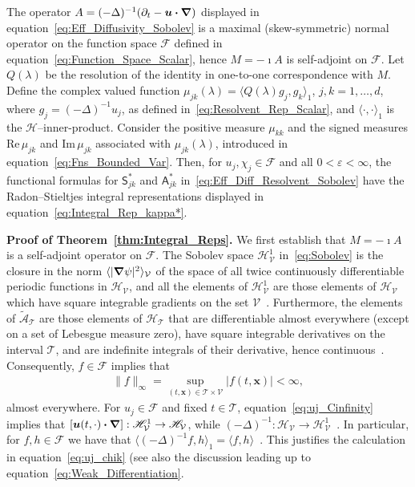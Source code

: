 \documentclass[leqno,onefignum,onetabnum]{siamltex1213}
\newcommand{\thmref}[1]{Theorem~\ref{#1}}
\newcommand\Real{\mbox{Re}\,} %
\newcommand\Imag{\mbox{Im}\,} %
\newcommand{\Tc}{\mathcal{T}}
\newcommand{\Vc}{\mathcal{V}}
\newcommand{\Sm}{\mathsf{S}}
\newcommand{\Am}{\mathsf{A}}
\newcommand{\Hs}{\mathscr{H}}
\newcommand{\As}{\mathscr{A}}
\newcommand{\Fs}{\mathscr{F}}
\newcommand\bnabla{\mbox{\boldmath${\nabla}$}}
\providecommand\bcdot{\boldsymbol{\cdot}}
\newcommand{\vecx}{\boldsymbol{x}}
\newcommand{\vecu}{\boldsymbol{u}}
\begin{document}
%
\begin{theorem}\label{thm:Integral_Reps}
  The operator $A=(-\Delta)^{-1}(\partial_t-\vecu\bcdot\bnabla)$ displayed in
  equation~\eqref{eq:Eff_Diffusivity_Sobolev} is a maximal
  (skew-symmetric) normal operator on the function space $\Fs$ defined
  in equation~\eqref{eq:Function_Space_Scalar}, hence $M=-\imath A$ is 
  self-adjoint on $\Fs$. Let $Q(\lambda)$ be the resolution of the
  identity in one-to-one correspondence with $M$. Define the complex
  valued   function $\mu_{jk}(\lambda)=\langle Q(\lambda)g_j,g_k\rangle_1$, $j,k=1,\ldots,d$, where
  $g_j=(-\Delta)^{-1}u_j$, as defined in~\eqref{eq:Resolvent_Rep_Scalar}, and 
  $\langle\cdot,\cdot\rangle_1$ is the $\Hs$--inner-product. Consider the positive measure
  $\mu_{kk}$ and the signed measures $\Real\mu_{jk}$ and $\Imag\mu_{jk}$
  associated with $\mu_{jk}(\lambda)$, introduced in
  equation~\eqref{eq:Fns_Bounded_Var}.  Then, for $u_j,\chi_j\in\Fs$
  and all $0<\varepsilon<\infty$,
  the functional formulas for $\Sm^*_{jk}$ and $\Am^*_{jk}$ 
  in~\eqref{eq:Eff_Diff_Resolvent_Sobolev} have the 
  Radon--Stieltjes integral representations displayed in
  equation~\eqref{eq:Integral_Rep_kappa*}.   
% 
\end{theorem}
%

\textbf{Proof of \thmref{thm:Integral_Reps}.}\hspace{1ex}
%
We first establish that $M=-\imath A$ is a self-adjoint operator on
$\Fs$. The Sobolev space $\Hs^1_{\Vc}$ in~\eqref{eq:Sobolev} is the
closure in the norm $\langle|\bnabla\psi|^2\rangle_{\Vc}$ of the space of all twice
continuously differentiable periodic functions in $\Hs_{\Vc}$, and all
the elements of $\Hs^1_{\Vc}$ are those elements of $\Hs_{\Vc}$ which
have square integrable gradients on the set
$\Vc$~\cite{Bhattacharya:AAP:1999:951}. Furthermore, the elements of
$\tilde{\As}_{\Tc}$ are those elements of $\Hs_{\Tc}$ that are
differentiable almost everywhere (except on a set of Lebesgue measure
zero), have square integrable derivatives on the interval
$\Tc$, and are indefinite integrals of their
derivative, hence continuous~\cite{Royden:1988:RA}. Consequently,
$f\in\Fs$ implies that~\cite{Stone:64,Royden:1988:RA}  
%
\begin{align}\label{eq:uj_Cinfinity}
  \|f\|_\infty=\sup_{(t,\vecx)\in\Tc\times\Vc}|f(t,\vecx)|<\infty,
\end{align}
%
almost everywhere. For $u_j\in\Fs$ and fixed $t\in\Tc$,
equation~\eqref{eq:uj_Cinfinity} implies that 
$[\vecu(t,\cdot)\bcdot\bnabla]:\Hs^1_{\Vc}\to\Hs_{\Vc}$, while
$(-\Delta)^{-1}:\Hs_{\Vc}\to\Hs^1_{\Vc}$~\cite{Bhattacharya:AAP:1999:951}. In
particular, for $f,h\in\Fs$ we have that
$\langle(-\Delta)^{-1}f,h\rangle_1=\langle f,h\rangle$~\cite{Bhattacharya:AAP:1999:951}. This 
justifies the calculation in equation~\eqref{eq:uj_chik} (see also the
discussion leading up to equation~\eqref{eq:Weak_Differentiation}.  
\end{document}
